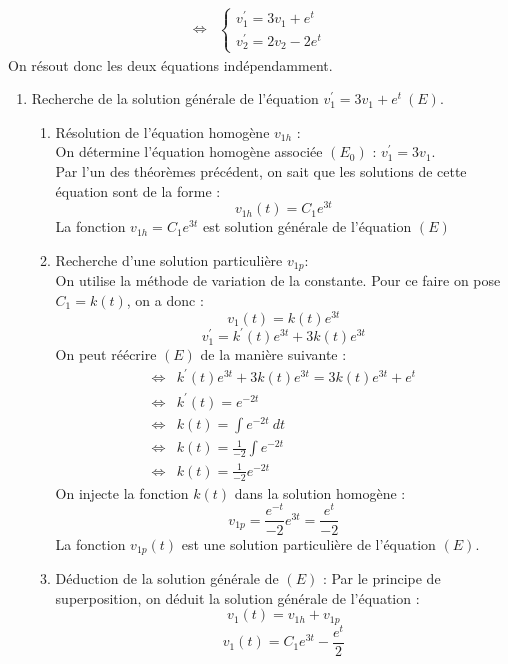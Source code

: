 \begin{ex}
\begin{align*}
    \Leftrightarrow & \begin{cases}
    v_1^{\prime}=3v_1+e^t\\
    v_2^{\prime}=2v_2-2e^t
    \end{cases}
\end{align*}
On résout donc les deux équations indépendamment.
\begin{enumerate}
    \item Recherche de la solution générale de l'équation $v_1^{\prime}=3v_1+e^t\ (E)$.
    \begin{enumerate}
        \item Résolution de l'équation homogène $v_{1h}$ :\\
        On détermine l'équation homogène associée $(E_0)$ : $v_1^{\prime}=3v_1$.\\
        Par l'un des théorèmes précédent, on sait que les solutions de cette équation sont de la forme :
        $$v_{1h}(t)=C_1e^{3t}$$
        La fonction $v_{1h}=C_1e^{3t}$ est solution générale de l'équation $(E)$
        \item Recherche d'une solution particulière $v_{1p}$:\\
        On utilise la méthode de variation de la constante.
        Pour ce faire on pose $C_1=k(t)$, on a donc :
        $$v_1(t)=k(t)e^{3t}$$
        $$v_1^{\prime}=k^{\prime}(t)e^{3t}+3k(t)e^{3t}$$
        On peut réécrire $(E)$ de la manière suivante :
        \begin{align*}
            \Leftrightarrow & k^{\prime}(t)e^{3t}+3k(t)e^{3t}=3k(t)e^{3t}+e^t\\
            \Leftrightarrow & k^{\prime}(t)=e^{-2t}\\
            \Leftrightarrow & k(t) = \int e^{-2t}\ dt\\
            \Leftrightarrow & k(t) = \frac{1}{-2}\int e^{-2t}\\
            \Leftrightarrow & k(t) = \frac{1}{-2}e^{-2t}
        \end{align*}
        On injecte la fonction $k(t)$ dans la solution homogène :\\
        $$v_{1p}=\frac{e^{-t}}{-2}e^{3t}=\frac{e^t}{-2}$$
        La fonction $v_{1p}(t)$ est une solution particulière de l'équation $(E)$.
        \item Déduction de la solution générale de $(E)$ :
        Par le principe de superposition, on déduit la solution générale de l'équation :
        $$v_1(t)=v_{1h}+v_{1p}$$
        $$v_1(t)=C_1e^{3t}-\frac{e^t}{2}$$
    \end{enumerate}

\end{enumerate}
\end{ex}
